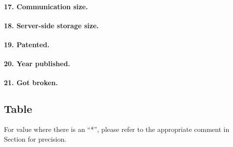 \documentclass[../report.tex]{subfiles}
\begin{document}
\paragraph{17. Communication size.}


\paragraph{18. Server-side storage size.}


\paragraph{19. Patented.}


\paragraph{20. Year published.}


\paragraph{21. Got broken.}




\subsection{Table}

For value where there is an ``*'', please refer to the appropriate comment in Section \cite{sec:comparison_details} for precision.
\end{document}
